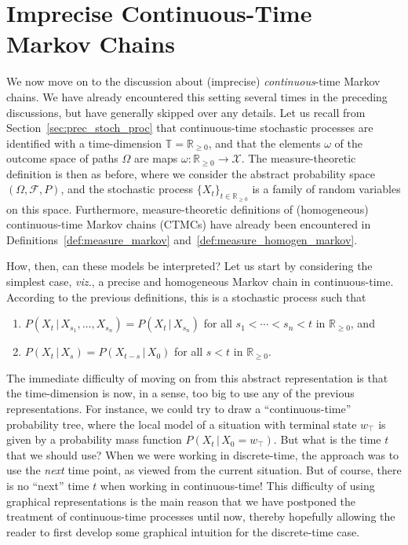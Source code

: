 \documentclass[graybox]{svmult}
\newcommand{\reals}{\mathbb{R}}
\newcommand{\realsnonneg}{\reals_{\geq 0}}
\newcommand{\states}{\mathcal{X}}
\newcommand{\timedim}{\mathbb{T}}
\begin{document}
\section{Imprecise Continuous-Time Markov Chains}\label{sec:ictmc}

We now move on to the discussion about (imprecise) \emph{continuous}-time Markov chains. We have already encountered this setting several times in the preceding discussions, but have generally skipped over any details. Let us recall from Section~\ref{sec:prec_stoch_proc} that continuous-time stochastic processes are identified with a time-dimension $\timedim=\realsnonneg$, and that the elements $\omega$ of the outcome space of paths $\Omega$ are maps $\omega:
\realsnonneg\to\states$. The measure-theoretic definition is then as before, where we consider the abstract probability space $(\Omega,\mathcal{F},P)$, and the stochastic process $\{X_t\}_{t\in\realsnonneg}$ is a family of random variables on this space. Furthermore, measure-theoretic definitions of (homogeneous) continuous-time Markov chains (CTMCs) have already been encountered in Definitions~\ref{def:measure_markov} and~\ref{def:measure_homogen_markov}.

How, then, can these models be interpreted? Let us start by considering the simplest case, \emph{viz.}, a precise and homogeneous Markov chain in continuous-time. According to the previous definitions, this is a stochastic process such that
\begin{enumerate}
\item $P(X_t\,\vert\, X_{s_1},\ldots,X_{s_n}) = P(X_t\,\vert\,X_{s_n})$ for all $s_1<\cdots<s_n<t$ in $\realsnonneg$, and 
\item $P(X_t\,\vert\,X_s) = P(X_{t-s}\,\vert\,X_0)$ for all $s<t$ in $\realsnonneg$.
\end{enumerate}
The immediate difficulty of moving on from this abstract representation is that the time-dimension is now, in a sense, too big to use any of the previous representations. For instance, we could try to draw a ``continuous-time'' probability tree, where the local model of a situation with terminal state $w_\top$ is given by a probability mass function $P(X_{t}\,\vert\,X_0=w_\top)$. But what is the time $t$ that we should use? When we were working in discrete-time, the approach was to use the \emph{next} time point, as viewed from the current situation. But of course, there is no ``next'' time $t$ when working in continuous-time! This difficulty of using graphical representations is the main reason that we have postponed the treatment of continuous-time processes until now, thereby hopefully allowing the reader to first develop some graphical intuition for the discrete-time case.
\end{document}
